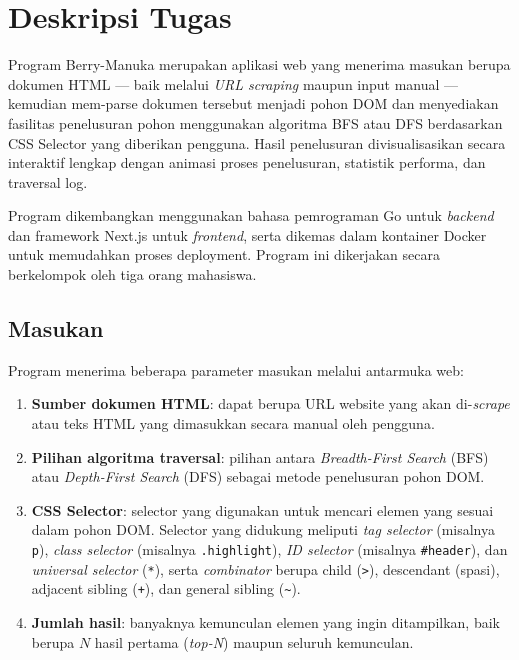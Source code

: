 \section{Deskripsi Tugas}

Program Berry-Manuka merupakan aplikasi web yang menerima masukan berupa
dokumen HTML --- baik melalui \textit{URL scraping} maupun input manual ---
kemudian mem-parse dokumen tersebut menjadi pohon DOM dan menyediakan
fasilitas penelusuran pohon menggunakan algoritma BFS atau DFS berdasarkan
CSS Selector yang diberikan pengguna. Hasil penelusuran divisualisasikan
secara interaktif lengkap dengan animasi proses penelusuran, statistik
performa, dan traversal log.

Program dikembangkan menggunakan bahasa pemrograman Go untuk \textit{backend}
dan framework Next.js untuk \textit{frontend}, serta dikemas dalam
kontainer Docker untuk memudahkan proses deployment. Program ini dikerjakan
secara berkelompok oleh tiga orang mahasiswa.

\subsection{Masukan}

Program menerima beberapa parameter masukan melalui antarmuka web:

\begin{enumerate}
    \item \textbf{Sumber dokumen HTML}: dapat berupa URL website yang akan
    di-\textit{scrape} atau teks HTML yang dimasukkan secara manual oleh
    pengguna.

    \item \textbf{Pilihan algoritma traversal}: pilihan antara
    \textit{Breadth-First Search} (BFS) atau \textit{Depth-First Search}
    (DFS) sebagai metode penelusuran pohon DOM.

    \item \textbf{CSS Selector}: selector yang digunakan untuk mencari elemen
    yang sesuai dalam pohon DOM. Selector yang didukung meliputi
    \textit{tag selector} (misalnya \texttt{p}), \textit{class selector}
    (misalnya \texttt{.highlight}), \textit{ID selector} (misalnya
    \texttt{\#header}), dan \textit{universal selector} (\texttt{*}), serta
    \textit{combinator} berupa child (\texttt{>}), descendant (spasi),
    adjacent sibling (\texttt{+}), dan general sibling (\texttt{\textasciitilde}).

    \item \textbf{Jumlah hasil}: banyaknya kemunculan elemen yang ingin
    ditampilkan, baik berupa $N$ hasil pertama (\textit{top-N}) maupun
    seluruh kemunculan.
\end{enumerate}

